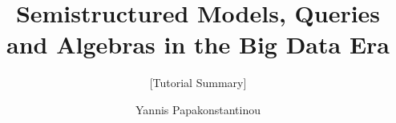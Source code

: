 \documentclass{sig-alternate-05-2015}
\begin{document}
\newcommand{\inrecord}[1]   { {#1}_{\operatorname{in}} } %
\newcommand{\outrecord}[1]  { {#1}_{\operatorname{out}} } %
\newcommand{\inbinding}[1]  { {#1}_{\operatorname{in}} }
\newcommand{\outbinding}[1] { {#1}_{\operatorname{out}} }

\newcommand{\id}[1]{{#1}^{id}}

\newcommand{\update}[2]{\gl{update}(#1,#2)}
\newcommand{\insertbag}[2]{\gl{insertinbag}(#1,#2)}
\newcommand{\inserttuple}[3]{\gl{inserinttuple}(#1,#2,#3)}
\newcommand{\append}[2]{\gl{append}(#1,#2)}
\newcommand{\delete}[1]{\gl{delete}(#1)}
\newcommand{\insertorder}[2]{\gl{insertorder}(#1,#2)}


\newcommand{\highlight}[1]{\noindent\textbf{#1:}}


\title{Semistructured Models, Queries and Algebras in the Big Data Era
}
\subtitle{[Tutorial Summary]}


\author{
\alignauthor Yannis Papakonstantinou\\
\\
}%


\maketitle
\end{document}
